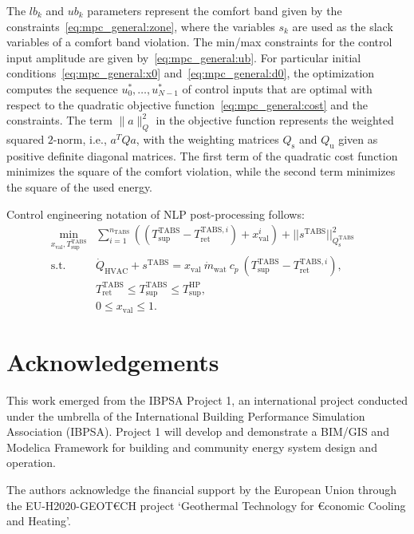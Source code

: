 \documentclass[10pt]{extarticle}
\newcommand{\lrp}[1]{\ensuremath{\left( #1 \right)}}
\begin{document}
The $lb_k$ and $ub_k$ parameters represent the comfort band 
given by the constraints~\eqref{eq:mpc_general:zone},
where the variables $s_k$ are used as the slack variables of a comfort band violation.
The min/max constraints for the control input amplitude are given by~\eqref{eq:mpc_general:ub}.
For particular initial conditions~\eqref{eq:mpc_general:x0} and~\eqref{eq:mpc_general:d0}, 
 the optimization computes the sequence $u_0^*, \ldots, u_{N-1}^*$ of control inputs that
are optimal with respect to the quadratic objective function~\eqref{eq:mpc_general:cost}
and the constraints.
The term $\|a\|_Q^2$ in the objective function represents the weighted squared $2$-norm, i.e., $a^T Q a$,
with the weighting matrices $Q_\text{s}$ and $Q_\text{u}$ given as positive 
definite diagonal matrices.
The first term of the quadratic cost function minimizes the square of the comfort violation,
while the second term minimizes the square of the used energy.
% 

Control engineering notation of NLP post-processing follows:
\begin{subequations}
\label{eq:NLP_postprocess}
\begin{align}
 \min_{x_{\text{val}}, T_{\text{sup}}^{\text{TABS}}} & \sum_{i=1}^{n_{\text{TABS}}} \lrp{(T_{\text{sup}}^{\text{TABS}} - T_{\text{ret}}^{\text{TABS},i}) + x_{\text{val}}^i } + || s^{\text{TABS}} ||_{Q^{\text{TABS}}_{\text{s}}}^2  &
 \label{eq:NLP_postprocess:cost}\\
  \text{s.t.} \ & \dot{Q}_{\text{HVAC}} + s^{\text{TABS}} = x_{\text{val}} \ \dot{m}_{\text{wat}} \ c_p \ (T_{\text{sup}}^{\text{TABS}} -  T_{\text{ret}}^{\text{TABS},i}), &  \label{eq:NLP_postprocess:heat_equation} \\
   &  T_{\text{ret}}^{\text{TABS}} \le T_{\text{sup}}^{\text{TABS}} \le T_{\text{sup}}^{\text{HP}}, \label{eq:NLP_postprocess:tsup_minmax}\\
    & 0 \le x_{\text{val}} \le 1.   \label{eq:NLP_postprocess:valve_minmax}
\end{align}
\end{subequations}




\section*{Acknowledgements}

This work emerged from the IBPSA Project 1, an international project conducted under the umbrella of the International Building Performance Simulation Association (IBPSA). Project 1 will develop and demonstrate a BIM/GIS and Modelica Framework for building and community energy system design and operation.

The authors acknowledge the financial support by the European Union through  the EU-H2020-GEOT\euro CH 
project ‘Geothermal Technology for \euro conomic Cooling and Heating’.
\end{document}
